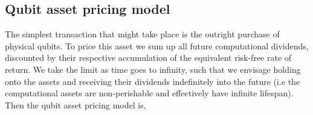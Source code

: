 









%
%

\subsection{Qubit asset pricing model}\label{sec:qubit_pricing_model}

The simplest transaction that might take place is the outright purchase of physical qubits. To price this asset we sum up all future computational dividends, discounted by their respective accumulation of the equivalent risk-free rate of return. We take the limit as time goes to infinity, such that we envisage holding onto the assets and receiving their dividends indefinitely into the future (i.e the computational assets are non-perishable and effectively have infinite lifespan). Then the qubit asset pricing model is,


